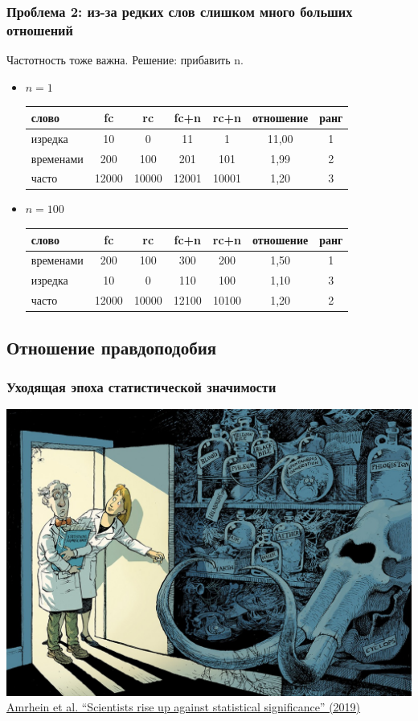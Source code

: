 \documentclass[svgnames]{beamer}
\begin{document}
\begin{frame}
  \frametitle{Проблема 2: из-за редких слов слишком много больших
    отношений}
  Частотность тоже важна.   Решение: прибавить n.

  \begin{itemize}
  \item $n=1$

  \begin{tabular}[l]{lcccccc}
    слово & fc & rc & fc+n & rc+n & отношение & ранг \\
    \hline
    изредка & 10 & 0 & 11 & 1 & 11,00 & 1 \\
    временами & 200 & 100 & 201 & 101 & 1,99 & 2 \\
    часто & 12000 & 10000 & 12001 & 10001 & 1,20 & 3 \\
  \end{tabular}
  
  \item $n=100$

  \begin{tabular}[l]{lcccccc}
    слово & fc & rc & fc+n & rc+n & отношение & ранг \\
    \hline
    временами & 200 & 100 & 300 & 200 & 1,50 & 1 \\
    изредка & 10 & 0 & 110 & 100 & 1,10 &  3 \\
    часто & 12000 & 10000 & 12100 & 10100 & 1,20 & 2 \\
  \end{tabular}

  \end{itemize}
  
\end{frame}

\subsection{Отношение правдоподобия}

\begin{frame}
  \frametitle{Уходящая эпоха статистической значимости}
  \centering
  \includegraphics[width=.9\textwidth]{significance}
  \footnotesize
  \href{https://www.nature.com/articles/d41586-019-00857-9}{Amrhein et
    al. “Scientists rise up against statistical significance” 
    (2019)}
\end{frame}
\end{document}
